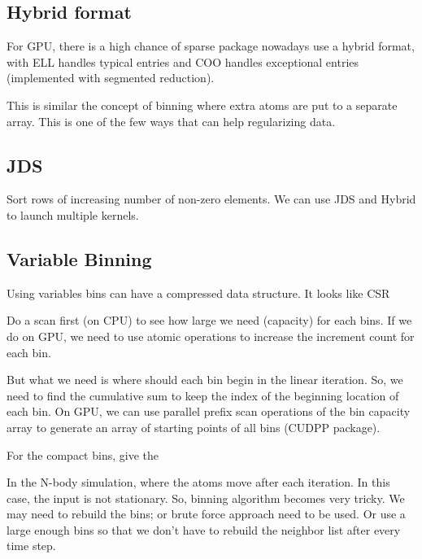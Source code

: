 \subsection{Hybrid format}
\label{sec:hybrid-format}

For GPU, there is a high chance of sparse package nowadays use a
hybrid format, with ELL handles typical entries and COO handles
exceptional entries (implemented with segmented reduction). 

This is similar the concept of binning where extra atoms are put to a
separate array. This is one of the few ways that can help regularizing
data. 

\subsection{JDS}
\label{sec:jds}

Sort rows of increasing number of non-zero elements. We can use JDS
and Hybrid to launch multiple kernels. 

\subsection{Variable Binning }
\label{sec:variable-binning-}


Using variables bins can have a compressed data structure. It looks
like CSR

Do a scan first (on CPU) to see how large we need (capacity) for each
bins. If we do on GPU, we need to use atomic operations to increase
the increment count for each bin. 

But what we need is where should each bin begin in the linear
iteration. So, we need to find the cumulative sum to keep the index of
the beginning location of each bin. On GPU, we can use parallel prefix
scan operations of the bin capacity array to generate an array of
starting points of all bins (CUDPP package). 

For the compact bins, give the 


In the N-body simulation, where the atoms move after each
iteration. In this case, the input is not stationary. So, binning
algorithm becomes very tricky. We may need to rebuild the bins; or
brute force approach need to be used. Or use a large enough bins so
that we don't have to rebuild the neighbor list after every time
step. 




